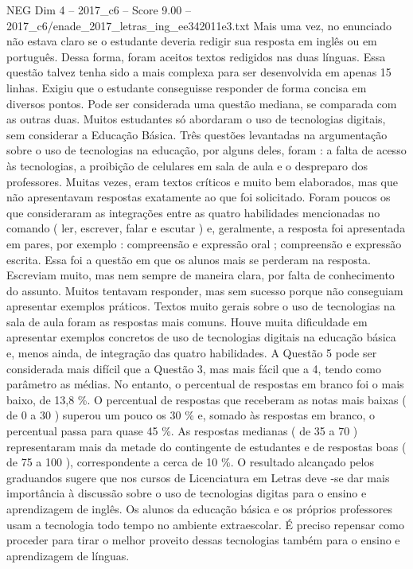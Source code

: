 \begin{textsample}{NEG Dim 4 – 2017\_c6 – Score 9.00 – 2017\_c6/enade\_2017\_letras\_ing\_ee342011e3.txt}
Mais uma vez, no enunciado não estava claro se o estudante deveria redigir sua resposta em inglês ou em português.
Dessa forma, foram aceitos textos redigidos nas duas línguas.
Essa questão talvez tenha sido a mais complexa para ser desenvolvida em apenas 15 linhas.
Exigiu que o estudante conseguisse responder de forma concisa em diversos pontos.
Pode ser considerada uma questão mediana, se comparada com as outras duas.
Muitos estudantes só abordaram o uso de tecnologias digitais, sem considerar a Educação Básica.
Três questões levantadas na argumentação sobre o uso de tecnologias na educação, por alguns deles, foram : a falta de acesso às tecnologias, a proibição de celulares em sala de aula e o despreparo dos professores.
Muitas vezes, eram textos críticos e muito bem elaborados, mas que não apresentavam respostas exatamente ao que foi solicitado.
Foram poucos os que consideraram as integrações entre as quatro habilidades mencionadas no comando ( ler, escrever, falar e escutar ) e, geralmente, a resposta foi apresentada em pares, por exemplo : compreensão e expressão oral ; compreensão e expressão escrita.
Essa foi a questão em que os alunos mais se perderam na resposta.
Escreviam muito, mas nem sempre de maneira clara, por falta de conhecimento do assunto.
Muitos tentavam responder, mas sem sucesso porque não conseguiam apresentar exemplos práticos.
Textos muito gerais sobre o uso de tecnologias na sala de aula foram as respostas mais comuns.
Houve muita dificuldade em apresentar exemplos concretos de uso de tecnologias digitais na educação básica e, menos ainda, de integração das quatro habilidades.
A Questão 5 pode ser considerada mais difícil que a Questão 3, mas mais fácil que a 4, tendo como parâmetro as médias.
No entanto, o percentual de respostas em branco foi o mais baixo, de 13,8 \%.
O percentual de respostas que receberam as notas mais baixas ( de 0 a 30 ) superou um pouco os 30 \% e, somado às respostas em branco, o percentual passa para quase 45 \%.
As respostas medianas ( de 35 a 70 ) representaram mais da metade do contingente de estudantes e de respostas boas ( de 75 a 100 ), correspondente a cerca de 10 \%.
O resultado alcançado pelos graduandos sugere que nos cursos de Licenciatura em Letras deve -se dar mais importância à discussão sobre o uso de tecnologias digitas para o ensino e aprendizagem de inglês.
Os alunos da educação básica e os próprios professores usam a tecnologia todo tempo no ambiente extraescolar.
É preciso repensar como proceder para tirar o melhor proveito dessas tecnologias também para o ensino e aprendizagem de línguas.

\end{textsample}
